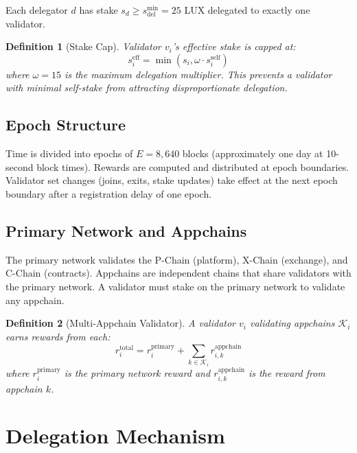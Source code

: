 \documentclass[11pt,a4paper]{article}
\newtheorem{definition}{Definition}
\begin{document}
Each delegator $d$ has stake $s_d \geq s^{\min}_{\text{del}} = 25$ LUX delegated to exactly one validator.

\begin{definition}[Stake Cap]
Validator $v_i$'s effective stake is capped at:
\begin{equation}
    s_i^{\text{eff}} = \min(s_i, \omega \cdot s_i^{\text{self}})
\end{equation}
where $\omega = 15$ is the maximum delegation multiplier. This prevents a validator with minimal self-stake from attracting disproportionate delegation.
\end{definition}

\subsection{Epoch Structure}

Time is divided into epochs of $E = 8{,}640$ blocks (approximately one day at 10-second block times). Rewards are computed and distributed at epoch boundaries. Validator set changes (joins, exits, stake updates) take effect at the next epoch boundary after a registration delay of one epoch.

\subsection{Primary Network and Appchains}

The primary network validates the P-Chain (platform), X-Chain (exchange), and C-Chain (contracts). Appchains are independent chains that share validators with the primary network. A validator must stake on the primary network to validate any appchain.

\begin{definition}[Multi-Appchain Validator]
A validator $v_i$ validating appchains $\mathcal{K}_i$ earns rewards from each:
\begin{equation}
    r_i^{\text{total}} = r_i^{\text{primary}} + \sum_{k \in \mathcal{K}_i} r_{i,k}^{\text{appchain}}
\end{equation}
where $r_i^{\text{primary}}$ is the primary network reward and $r_{i,k}^{\text{appchain}}$ is the reward from appchain $k$.
\end{definition}

\section{Delegation Mechanism}\label{sec:delegation}
\end{document}
